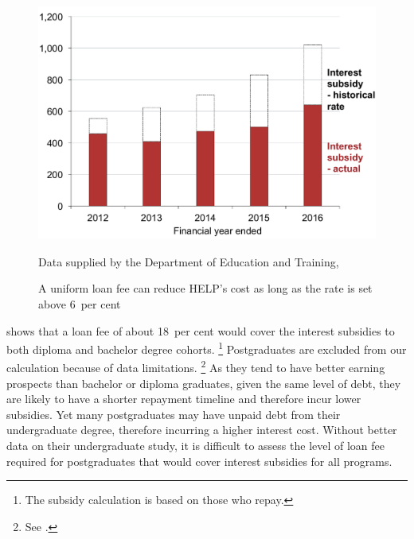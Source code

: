 \documentclass{grattan}
\begin{document}
\begin{figure}
\caption[A uniform loan fee can reduce {HELP}'s cost as long as the rate is set above 6~per cent]{A uniform loan fee can reduce \gls{HELP}'s cost as long as the rate is set above 6~per cent}\label{fig:fig20-uniform-loan-fee-can-reduce-HELPs-cost-as-long-as-the-rate-is-set-above-6pc}

\includegraphics[page=20]{atlas/Chartpack.pdf}

%
{Data supplied by the Department of Education and Training, \textcites[][Table~57]{Education2015Highereducationreport}[][15]{Ryan2016RedesigningVETFEE}{Birmingham2016MediareleaseNew}}
\end{figure}

 shows that a loan fee of about 18~per cent would cover the interest subsidies to both diploma and bachelor degree cohorts.%
   \footnote{The subsidy calculation is based on those who repay.} Postgraduates are excluded from our calculation because of data limitations.%
   \footnote{See .} As they tend to have better earning prospects than bachelor or diploma graduates, given the same level of debt, they are likely to have a shorter repayment timeline and therefore incur lower subsidies.
Yet many postgraduates may have unpaid debt from their undergraduate degree, therefore incurring a higher interest cost.
Without better data on their undergraduate study, it is difficult to assess the level of loan fee required for postgraduates that would cover interest subsidies for all programs.
\end{document}
